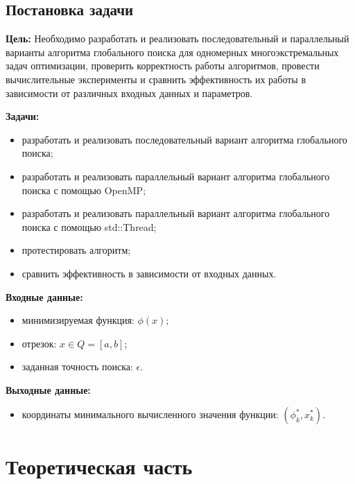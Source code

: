 \documentclass{report}
\begin{document}
\newpage

\section*{Постановка задачи}

\textbf{Цель:} Необходимо разработать и реализовать последовательный и параллельный варианты алгоритма глобального поиска для одномерных многоэкстремальных задач оптимизации, проверить корректность работы алгоритмов, провести вычислительные эксперименты и сравнить эффективность их работы в зависимости от различных входных данных и параметров.

\textbf{Задачи:}
\begin{itemize}
    \item разработать и реализовать последовательный вариант алгоритма глобального поиска;
    \item разработать и реализовать параллельный вариант алгоритма глобального поиска с помощью OpenMP;
    \item разработать и реализовать параллельный вариант алгоритма глобального поиска с помощью std::Thread;
    \item протестировать алгоритм;
    \item сравнить эффективность в зависимости от входных данных.
\end{itemize}

\textbf{Входные данные:}

\begin{itemize}
    \item минимизируемая функция: $\phi (x)$;
    \item отрезок: $x \in Q=[a,b]$;
    \item заданная точность поиска: $\epsilon$.
\end{itemize}

\textbf{Выходные данные:}

\begin{itemize}
    \item координаты минимального вычисленного значения функции: $(\phi_k^*,x_k^*)$.
\end{itemize}

\newpage

\chapter{Теоретическая часть}
\end{document}
